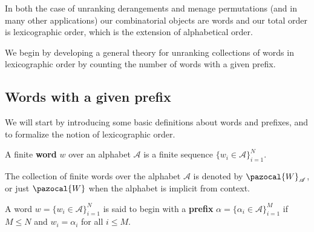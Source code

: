 
In both the case of unranking derangements and menage permutations
(and in many other applications) our combinatorial objects are
words and our total order is lexicographic order, which is the extension of
alphabetical order.

We begin by developing a general theory for unranking collections of words in
lexicographic order by counting the number of words with a given prefix.
\subsection{Words with a given prefix}

We will start by introducing some basic definitions about words and prefixes,
and to formalize the notion of lexicographic order.

\begin{definition}
  A finite \textbf{word} $w$ over an alphabet $\mathcal A$ is a finite sequence
  $\{w_i \in \mathcal A\}_{i=1}^N$.

  The collection of finite words over the alphabet $\mathcal A$ is denoted by
  $\pazocal{W}_\mathcal{A}$, or just $\pazocal{W}$ when the alphabet is
  implicit from context.
\end{definition}

\begin{definition}
  A word $w = \{w_i \in \mathcal A\}_{i=1}^N$ is said to begin with a
  \textbf{prefix} $\alpha = \{\alpha_i \in \mathcal A\}_{i=1}^M$ if
  $M \leq N$ and $w_i = \alpha_i$ for all $i \leq M$.
\end{definition}

